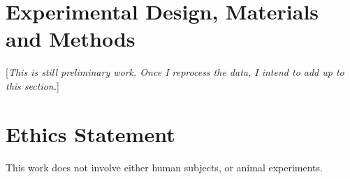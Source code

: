 \documentclass[times,final]{elsarticle.cls}
\begin{document}

\section*{Experimental Design, Materials and Methods}

[\textit{This is still preliminary work. Once I reprocess the data, I intend to add up to this section.}]


\section*{Ethics Statement}
This work does not involve either human subjects, or animal experiments.


\end{document}
